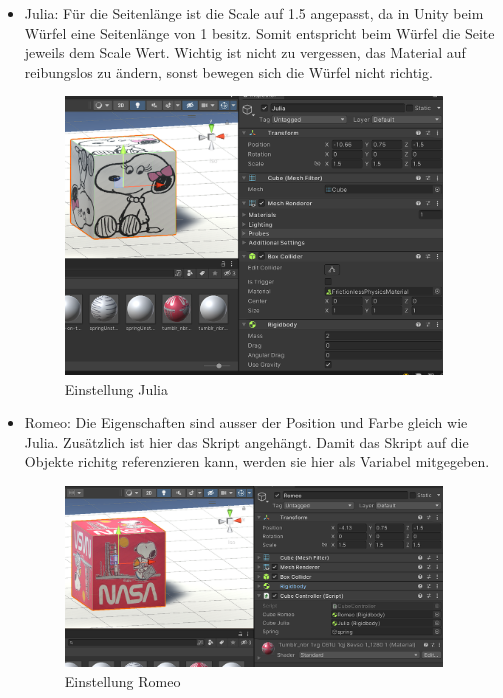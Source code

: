 \documentclass[../main.tex]{subfiles}
\begin{document}
\begin{itemize}
    \item Julia:
    \newline Für die Seitenlänge ist die Scale auf 1.5 angepasst, da in Unity beim Würfel eine Seitenlänge von 1 besitz. Somit entspricht beim Würfel die Seite jeweils dem Scale Wert. Wichtig ist nicht zu vergessen, das Material auf reibungslos zu ändern, sonst bewegen sich die Würfel nicht richtig.
    \begin{figure}[H]
        \begin{center}
        \centerline{\includegraphics[width=100mm]{./images/2Lab_JuliaCube.PNG}}
            \caption{Einstellung Julia}
            \label{fig:2Lab_JuliaCube}
        \end{center}
    \end{figure}

    \item Romeo: 
    \newline Die Eigenschaften sind ausser der Position und Farbe gleich wie Julia. Zusätzlich ist hier das Skript angehängt. Damit das Skript auf die Objekte richitg referenzieren kann, werden sie hier als Variabel mitgegeben.
    \begin{figure}[H]
        \begin{center}
        \centerline{\includegraphics[width=100mm]{./images/2Lab_RomeoCube.PNG}}
            \caption{Einstellung Romeo}
            \label{fig:2Lab_RomeoCube}
        \end{center}
    \end{figure}


\end{itemize}
\end{document}

